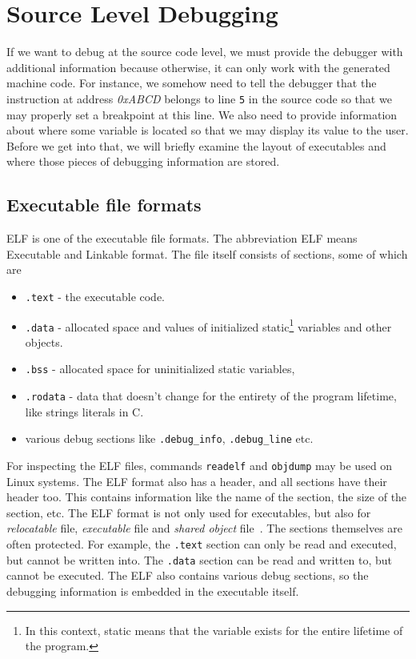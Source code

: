 \section{Source Level Debugging}\label{section:source-level-debugging}
If we want to debug at the source code level, we must provide the debugger with
additional information because otherwise, it can only work with the generated
machine code. For instance, we somehow need to tell the debugger that the
instruction at address \textit{0xABCD} belongs to line \texttt{5} in the source
code so that we may properly set a breakpoint at this line. We also need to
provide information about where some variable is located so that we may display
its value to the user. Before we get into that, we will briefly examine the
layout of executables and where those pieces of debugging information are
stored.

\subsection{Executable file formats}
ELF is one of the executable file formats. The abbreviation ELF means
Executable and Linkable format. The file itself consists of sections, some of
which are
\begin{itemize}
    \item \texttt{.text} - the executable code.
    \item \texttt{.data} - allocated space and values of initialized
        static\footnote{In this context, static means that the variable exists
        for the entire lifetime of the program.} variables and other objects.
    \item \texttt{.bss} - allocated space for uninitialized static variables,
    \item \texttt{.rodata} - data that doesn't change for the entirety of the
        program lifetime, like strings literals in C.
    \item various debug sections like \verb|.debug_info|, \verb|.debug_line|
        etc.
\end{itemize}
For inspecting the ELF files, commands \texttt{readelf} and \texttt{objdump}
may be used on Linux systems. The ELF format also has a header, and all
sections have their header too. This contains information like the name of the
section, the size of the section, etc. The ELF format is not only used for
executables, but also for \textit{relocatable} file, \textit{executable} file
and \textit{shared object} file~\cite{elf}. The sections themselves are often
protected. For example, the \texttt{.text} section can only be read and
executed, but cannot be written into. The \texttt{.data} section can be read
and written to, but cannot be executed. The ELF also contains various debug
sections, so the debugging information is embedded in the executable itself.

